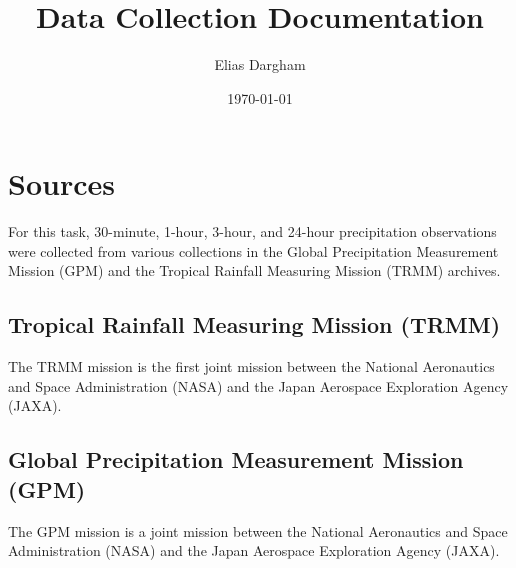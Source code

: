 \documentclass[
  12pt,
  a4paper,
]{article}
\author{Elias Dargham}
\title{Data Collection Documentation}
\date{\today}
\begin{document}
\maketitle



\section{Sources}
For this task, 30-minute, 1-hour, 3-hour, and 24-hour precipitation observations
were collected from various collections in the Global Precipitation 
Measurement Mission (GPM) and the Tropical Rainfall Measuring Mission (TRMM) 
archives.

\subsection*{Tropical Rainfall Measuring Mission (TRMM)}
The TRMM mission is the first joint mission between the National Aeronautics and 
Space Administration (NASA) and the Japan Aerospace Exploration Agency (JAXA).

\subsection*{Global Precipitation Measurement Mission (GPM)}
The GPM mission is a joint mission between the National Aeronautics and Space 
Administration (NASA) and the Japan Aerospace Exploration Agency (JAXA).
\end{document}
